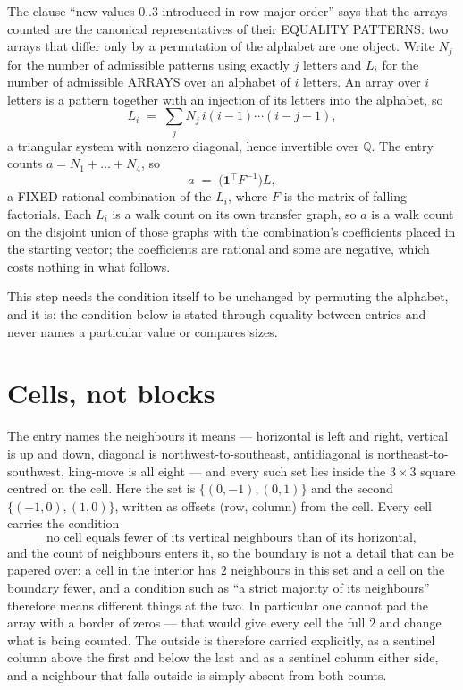 \documentclass[11pt,a4paper]{article}
\theoremstyle{plain}
\theoremstyle{definition}
\begin{document}
The clause ``new values $0..3$ introduced in row major order'' says that the arrays
counted are the canonical representatives of their EQUALITY PATTERNS: two arrays that differ
only by a permutation of the alphabet are one object. Write $N_j$ for the number of admissible
patterns using exactly $j$ letters and $L_i$ for the number of admissible ARRAYS over an
alphabet of $i$ letters. An array over $i$ letters is a pattern together with an injection of
its letters into the alphabet, so
\[
L_i\;=\;\sum_{j}N_j\,i(i-1)\cdots(i-j+1),
\]
a triangular system with nonzero diagonal, hence invertible over $\mathbb{Q}$. The entry
counts $a=N_1+\dots+N_{4}$, so
\[
a\;=\;\bigl(\mathbf{1}^{\!\top}F^{-1}\bigr)L ,
\]
a FIXED rational combination of the $L_i$, where $F$ is the matrix of falling factorials.
Each $L_i$ is a walk count on its own transfer graph, so $a$ is a walk count on the disjoint
union of those graphs with the combination's coefficients placed in the starting vector; the
coefficients are rational and some are negative, which costs nothing in what follows.

This step needs the condition itself to be unchanged by permuting the alphabet, and it is:
the condition below is stated through equality between entries and never names a particular
value or compares sizes.

\section{Cells, not blocks}

The entry names the neighbours it means --- horizontal is left and right, vertical is up and
down, diagonal is northwest-to-southeast, antidiagonal is northeast-to-southwest, king-move is
all eight --- and every such set lies inside the $3\times3$ square centred on the cell. Here
the set is $\{(0,-1), (0,1)\}$ and the second $\{(-1,0), (1,0)\}$, written as offsets (row, column) from the cell. Every cell carries
the condition
\[
\text{no cell equals fewer of its vertical neighbours than of its horizontal},
\]
and the count of neighbours enters it, so the boundary is not a detail that can be papered
over: a cell in the interior has $2$ neighbours in this set and a cell on the boundary
fewer, and a condition such as ``a strict majority of its neighbours'' therefore means
different things at the two. In particular one cannot pad the array with a border of zeros ---
that would give every cell the full $2$ and change what is being counted. The outside is
therefore carried
explicitly, as a sentinel column above the first and below the last and as a sentinel column
either side, and a neighbour that falls outside is simply absent from both counts.
\end{document}
